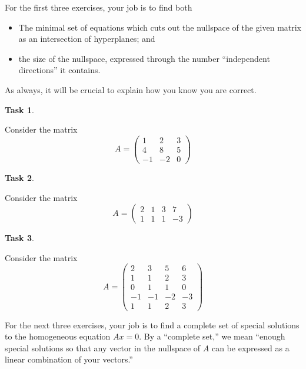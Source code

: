 \documentclass[10pt,]{book}
\theoremstyle{plain}
\theoremstyle{definition}
\numberwithin{equation}{section}
\newtheorem{task}{Task}[chapter]
\begin{document}
      For the first three exercises, your job is to find both
      \begin{itemize}
\item{}The minimal set of equations which cuts out the nullspace of the
          given matrix as an intersection of hyperplanes; and
        \item{}the size of the nullspace, expressed through the number
          ``independent directions'' it contains.
        \end{itemize}

      As always, it will be crucial to explain how you know you are correct.
\begin{task}
\label{task-88}

        Consider the matrix
        \[
          A = \begin{pmatrix}
          1 & 2 & 3 \\
          4 & 8 & 5 \\
          -1 & -2 & 0
          \end{pmatrix}
        \]\end{task}
\begin{task}
\label{task-89}

      Consider the matrix
      \[
        A = \begin{pmatrix}
        2 & 1 & 3 & 7 \\
        1 & 1 & 1 & -3
        \end{pmatrix}
      \]\end{task}
\begin{task}
\label{task-90}

        Consider the matrix
        \[
          A = \begin{pmatrix}
          2 & 3 & 5 & 6 \\
          1 & 1 & 2 & 3 \\
          0 & 1 & 1 & 0 \\
          -1 & -1 & -2 & -3 \\
          1 & 1 & 2 & 3
          \end{pmatrix}
        \]\end{task}
\par

      For the next three exercises, your job is to find a complete set of
      special solutions to the homogeneous equation \(Ax=0\).
      By a ``complete set,'' we mean ``enough special solutions so that
      any vector in the nullspace of \(A\) can be expressed as a linear
      combination of your vectors.''
\par
\end{document}
